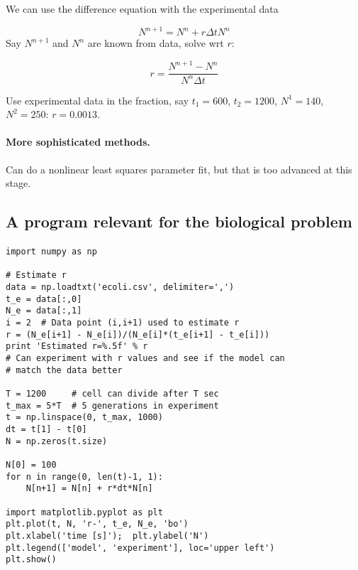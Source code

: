 \documentclass[%
twoside,                 %
final,                   %
10pt]{article}
\begin{document}
\noindent
We can use the difference equation with the experimental data

\[ N^{n+1} = N^n + r\Delta t N^n\]
Say $N^{n+1}$ and $N^n$ are known from data, solve wrt $r$:

\[ r = \frac{N^{n+1}-N^n}{N^n\Delta t} \]

Use experimental data in the fraction, say $t_1=600$, $t_2=1200$,
$N^1=140$, $N^2=250$: $r=0.0013$.




\paragraph{More sophisticated methods.}
Can do a nonlinear least squares parameter fit, but that is
too advanced at this stage.



\subsection*{A program relevant for the biological problem}



\paragraph{}
\begin{verbatim}
import numpy as np

# Estimate r
data = np.loadtxt('ecoli.csv', delimiter=',')
t_e = data[:,0]
N_e = data[:,1]
i = 2  # Data point (i,i+1) used to estimate r
r = (N_e[i+1] - N_e[i])/(N_e[i]*(t_e[i+1] - t_e[i]))
print 'Estimated r=%.5f' % r
# Can experiment with r values and see if the model can
# match the data better

T = 1200     # cell can divide after T sec
t_max = 5*T  # 5 generations in experiment
t = np.linspace(0, t_max, 1000)
dt = t[1] - t[0]
N = np.zeros(t.size)

N[0] = 100
for n in range(0, len(t)-1, 1):
    N[n+1] = N[n] + r*dt*N[n]

import matplotlib.pyplot as plt
plt.plot(t, N, 'r-', t_e, N_e, 'bo')
plt.xlabel('time [s]');  plt.ylabel('N')
plt.legend(['model', 'experiment'], loc='upper left')
plt.show()
\end{verbatim}
\end{document}
